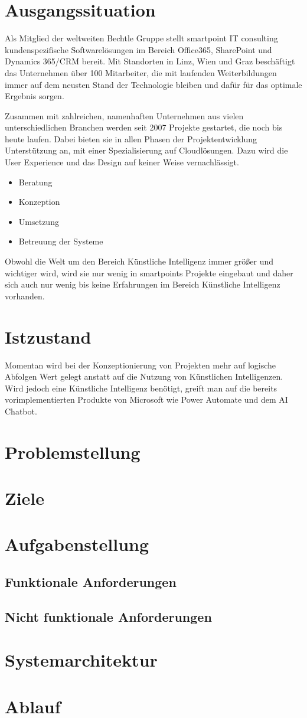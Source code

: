\section{Ausgangssituation}

Als Mitglied der weltweiten Bechtle Gruppe stellt smartpoint IT consulting kundenspezifische Softwarelösungen im Bereich Office365, SharePoint und Dynamics 365/CRM bereit. Mit Standorten in Linz, Wien und Graz beschäftigt das Unternehmen über 100 Mitarbeiter, die mit laufenden Weiterbildungen immer auf dem neusten Stand der Technologie bleiben und dafür für das optimale Ergebnis sorgen.

Zusammen mit zahlreichen, namenhaften Unternehmen aus vielen unterschiedlichen Branchen werden seit 2007 Projekte gestartet, die noch bis heute laufen. Dabei bieten sie in allen Phasen der Projektentwicklung Unterstützung an, mit einer Spezialisierung auf Cloudlösungen. Dazu wird die User Experience und das Design auf keiner Weise vernachlässigt.

\begin{itemize}
    \item Beratung
    \item Konzeption
    \item Umsetzung
    \item Betreuung der Systeme
\end{itemize}

Obwohl die Welt um den Bereich Künstliche Intelligenz immer größer und wichtiger wird, wird sie nur wenig in smartpoints Projekte eingebaut und daher sich auch nur wenig bis keine Erfahrungen im Bereich Künstliche Intelligenz vorhanden.

\section{Istzustand}

Momentan wird bei der Konzeptionierung von Projekten mehr auf logische Abfolgen Wert gelegt anstatt auf die Nutzung von Künstlichen Intelligenzen. Wird jedoch eine Künstliche Intelligenz benötigt, greift man auf die bereits vorimplementierten Produkte von Microsoft wie Power Automate und dem AI Chatbot.

\section{Problemstellung}
\section{Ziele}
\section{Aufgabenstellung}
\subsection{Funktionale Anforderungen}
\subsection{Nicht funktionale Anforderungen}
\section{Systemarchitektur}
\section{Ablauf}